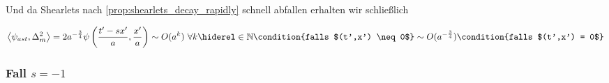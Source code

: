 Und da Shearlets nach \cref{prop:shearlets_decay_rapidly} schnell abfallen erhalten wir schließlich

\begin{dmath}
    \left\langle \psi_{ast},\Delta_m^{2}\right\rangle
    = 2 a^{-\frac{3}{4}} \psi \left(\frac{t'-sx'}{a}, \frac{x'}{a}\right)
    \sim O(a^k) ~\forall k \hiderel \in \mathbb{N} \condition{falls $(t',x') \neq 0$}
    \sim O(a^{-\frac{3}{4}}) \condition{falls $(t',x') = 0$}
\label{eq:delta_m2_s<1}
\end{dmath}

\subsubsection*{\texorpdfstring{Fall $s = -1$}{Fall s = 1}}

